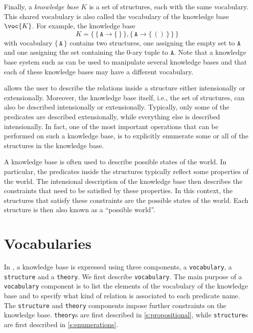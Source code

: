 \documentclass{article}
\begin{document}
Finally, a \emph{knowledge base} $K$ is a set of structures, each
with the same vocabulary.  This shared vocabulary is also called
the vocabulary of the knowledge base $\voc{K}$.
For example, the knowledge base
$$
K = \{\,
\{\, \mathtt{A} \to \{\, \} \,\},
\{\, \mathtt{A} \to \{\, () \,\} \,\}
\,\}
$$
with vocabulary $\{\, \mathtt{A} \,\}$ contains two structures,
one assigning the empty set to $\mathtt{A}$ and
one assigning the set containing the $0$-ary tuple to $\mathtt{A}$.
Note that a knowledge base system such as \idp can be used
to manipulate several knowledge bases and that each of these
knowledge bases may have a different vocabulary.

\idp allows the user to describe the relations inside a structure
either intensionally or extensionally.
Moreover, the knowledge base itself, i.e., the set of structures,
can also be described intensionally or extensionally.
Typically, only some of the
predicates are described extensionally, while everything else
is described intensionally.
In fact, one of the most important operations that can be performed
on such a knowledge base, is to explicitly enumerate some or all of the
structures in the knowledge base.

A knowledge base is often used to describe possible states of the world.
In particular, the predicates inside the structures typically reflect
some properties of the world.  The intensional description of
the knowledge base then describes the constraints that need to
be satisfied by these properties.  In this context, the structures that satisfy
these constraints are the possible states of the world.
Each structure is then also known as a ``possible world''.

\section{Vocabularies}

In \idp, a knowledge base is expressed using three components,
a \texttt{vocabulary}, a \texttt{structure} and a \texttt{theory}.
We first describe \texttt{vocabulary}.
The main purpose of a \texttt{vocabulary} component is to list
the elements of the vocabulary of the knowledge base and to specify
what kind of relation is associated to each predicate name.
The \texttt{structure} and \texttt{theory} components impose
further constraints on the knowledge base.
\texttt{theory}s are first described in \autoref{s:propositional},
while \texttt{structure}s are first described in \autoref{s:enumerations}.
\end{document}
